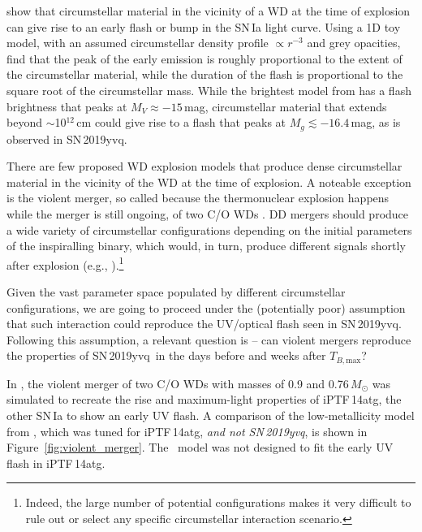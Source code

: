 \documentclass[twocolumn]{aastex63}
\newcommand{\tbmax}{$T_{B,\mathrm{max}}$}
\newcommand{\sn}{SN\,2019yvq}
\begin{document}
\citet{Piro16} show that circumstellar material in the vicinity of a WD at the
time of explosion can give rise to an early flash or bump in the SN\,Ia light
curve. Using a 1D toy model, with an assumed circumstellar density profile
$\propto r^{-3}$ and grey opacities, \citet{Piro16} find that the peak of the
early emission is roughly proportional to the extent of the circumstellar
material, while the duration of the flash is proportional to the square root
of the circumstellar mass. While the brightest model from \citet{Piro16} has a
flash brightness that peaks at $M_V \approx -15$\,mag, circumstellar material
that extends beyond $\sim$10$^{12}$\,cm could give rise to a flash that peaks
at $M_g \lesssim -16.4$\,mag, as is observed in \sn.

There are few proposed WD explosion models that produce dense circumstellar
material in the vicinity of the WD at the time of explosion. A noteable
exception is the violent merger, so called because the thermonuclear explosion
happens while the merger is still ongoing, of two C/O WDs
\citep{Pakmor10,Pakmor11,Pakmor12}. DD mergers should produce a wide variety
of circumstellar configurations depending on the initial parameters of the
inspiralling binary, which would, in turn, produce different signals shortly
after explosion (e.g., \citealt{Raskin13,Levanon19}).\footnote{Indeed, the
large number of potential configurations makes it very difficult to rule out
or select any specific circumstellar interaction scenario.}

Given the vast parameter space populated by different circumstellar
configurations, we are going to proceed under the (potentially poor)
assumption that such interaction could reproduce the UV/optical flash seen in
\sn. Following this assumption, a relevant question is -- can violent mergers
reproduce the properties of \sn\ in the days before and weeks after \tbmax?

In \citet{Kromer16}, the violent merger of two C/O WDs with masses of 0.9 and
0.76\,$M_\odot$ was simulated to recreate the rise and maximum-light
properties of iPTF\,14atg, the other SN\,Ia to show an early UV flash. A
comparison of the low-metallicity model from \citet{Kromer16}, which was tuned
for iPTF\,14atg, \textit{and not \sn}, is shown in
Figure~\ref{fig:violent_merger}. The \citeauthor{Kromer16}~model was not
designed to fit the early UV flash in iPTF\,14atg.
\end{document}
